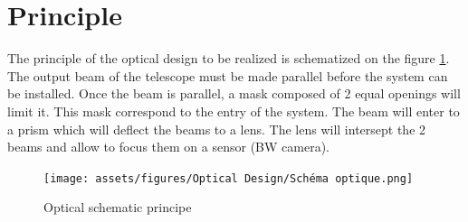 \section{Principle}
The principle of the optical design to be realized is schematized on the figure \ref{fig:OpticalPrincipe}.\bigbreak
The output beam of the telescope must be made parallel before the system can be installed. Once the beam is parallel,
a mask composed of 2 equal openings will limit it. This mask correspond to the entry of the system.\newline
The beam will enter to a prism which will deflect the beams to a lens.
The lens will intersept the 2 beams and allow to focus them on a sensor (BW camera).
\begin{figure}[H]
    \centering
    \texttt{[image: assets/figures/Optical Design/Schéma optique.png]}
    \caption{Optical schematic principe}
    \label{fig:OpticalPrincipe}
\end{figure}
\newpage
